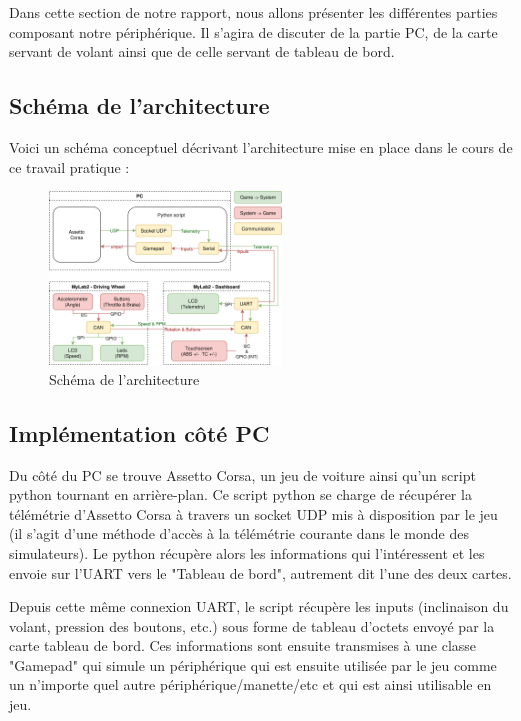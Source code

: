 \documentclass[french, 11pt]{article}
\begin{document}
		Dans cette section de notre rapport, nous allons présenter les différentes parties composant notre périphérique. Il s'agira de discuter de la partie PC, de la carte servant de volant ainsi que de celle servant de tableau de bord.

		\subsection{Schéma de l'architecture}

			Voici un schéma conceptuel décrivant l'architecture mise en place dans le cours de ce travail pratique :

			\begin{figure}[H]
				\centering
				\includegraphics[width=0.55\textwidth]{Images/architecture.drawio.png}
				\caption{Schéma de l'architecture}
			\end{figure}
			
        \subsection{Implémentation côté PC}

        Du côté du PC se trouve Assetto Corsa, un jeu de voiture ainsi qu'un script python tournant en arrière-plan. Ce script python se charge de récupérer la télémétrie d'Assetto Corsa à travers un socket UDP mis à disposition par le jeu (il s'agit d'une méthode d'accès à la télémétrie courante dans le monde des simulateurs). Le python récupère alors les informations qui l'intéressent et les envoie sur l'UART vers le "Tableau de bord", autrement dit l'une des deux cartes. 
		
		Depuis cette même connexion UART, le script récupère les inputs (inclinaison du volant, pression des boutons, etc.) sous forme de tableau d'octets envoyé par la carte tableau de bord. Ces informations sont ensuite transmises à une classe "Gamepad" qui simule un périphérique qui est ensuite utilisée par le jeu comme un n'importe quel autre périphérique/manette/etc et qui est ainsi utilisable en jeu.
\end{document}
